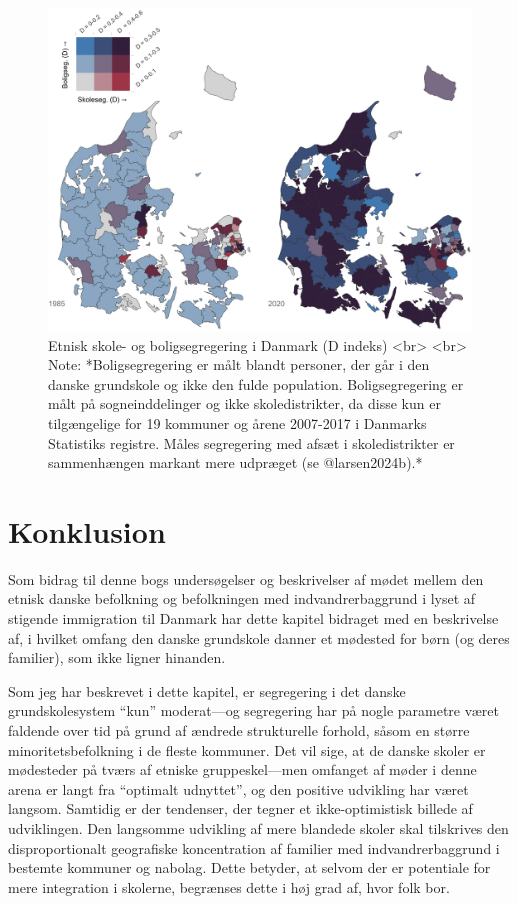 \documentclass[
]{book}
\begin{document}
\begin{figure}
\includegraphics[width=1\linewidth]{images/Figur5} \caption{Etnisk skole- og boligsegregering i Danmark (D indeks) <br> <br> Note: *Boligsegregering er målt blandt personer, der går i den danske grundskole og ikke den fulde population. Boligsegregering er målt på sogneinddelinger og ikke skoledistrikter, da disse kun er tilgængelige for 19 kommuner og årene 2007-2017 i Danmarks Statistiks registre. Måles segregering med afsæt i skoledistrikter er sammenhængen markant mere udpræget (se @larsen2024b).*}\label{fig:fig-3-4}
\end{figure}

\newpage

\section{Konklusion}\label{konklusion}

Som bidrag til denne bogs undersøgelser og beskrivelser af mødet mellem den etnisk danske befolkning og befolkningen med indvandrerbaggrund i lyset af stigende immigration til Danmark har dette kapitel bidraget med en beskrivelse af, i hvilket omfang den danske grundskole danner et mødested for børn (og deres familier), som ikke ligner hinanden.

Som jeg har beskrevet i dette kapitel, er segregering i det danske grundskolesystem ``kun'' moderat---og segregering har på nogle parametre været faldende over tid på grund af ændrede strukturelle forhold, såsom en større minoritetsbefolkning i de fleste kommuner. Det vil sige, at de danske skoler er mødesteder på tværs af etniske gruppeskel---men omfanget af møder i denne arena er langt fra ``optimalt udnyttet'', og den positive udvikling har været langsom. Samtidig er der tendenser, der tegner et ikke-optimistisk billede af udviklingen. Den langsomme udvikling af mere blandede skoler skal tilskrives den disproportionalt geografiske koncentration af familier med indvandrerbaggrund i bestemte kommuner og nabolag. Dette betyder, at selvom der er potentiale for mere integration i skolerne, begrænses dette i høj grad af, hvor folk bor.
\end{document}
